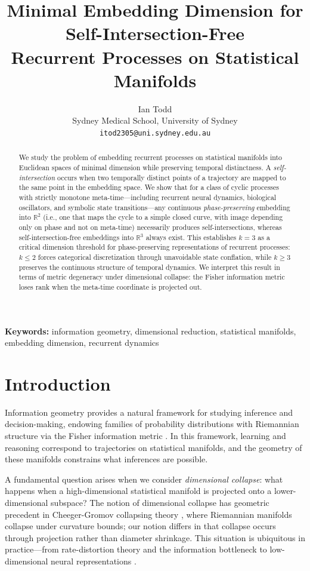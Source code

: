 \documentclass[12pt]{article}
\title{Minimal Embedding Dimension for Self-Intersection-Free \\
Recurrent Processes on Statistical Manifolds}
\author{Ian Todd\\
Sydney Medical School, University of Sydney\\
\texttt{itod2305@uni.sydney.edu.au}}
\date{}
\newcommand{\R}{\mathbb{R}}
\begin{document}
\maketitle

\begin{abstract}
We study the problem of embedding recurrent processes on statistical manifolds into Euclidean spaces of minimal dimension while preserving temporal distinctness. A \emph{self-intersection} occurs when two temporally distinct points of a trajectory are mapped to the same point in the embedding space. We show that for a class of cyclic processes with strictly monotone meta-time---including recurrent neural dynamics, biological oscillators, and symbolic state transitions---any continuous \emph{phase-preserving} embedding into $\R^2$ (i.e., one that maps the cycle to a simple closed curve, with image depending only on phase and not on meta-time) necessarily produces self-intersections, whereas self-intersection-free embeddings into $\R^3$ always exist. This establishes $k=3$ as a critical dimension threshold for phase-preserving representations of recurrent processes: $k \leq 2$ forces categorical discretization through unavoidable state conflation, while $k \geq 3$ preserves the continuous structure of temporal dynamics. We interpret this result in terms of metric degeneracy under dimensional collapse: the Fisher information metric loses rank when the meta-time coordinate is projected out.
\end{abstract}

\noindent\textbf{Keywords:} information geometry, dimensional reduction, statistical manifolds, embedding dimension, recurrent dynamics

\section{Introduction}

Information geometry provides a natural framework for studying inference and decision-making, endowing families of probability distributions with Riemannian structure via the Fisher information metric \citep{amari2016information,rao1945information}. In this framework, learning and reasoning correspond to trajectories on statistical manifolds, and the geometry of these manifolds constrains what inferences are possible.

A fundamental question arises when we consider \emph{dimensional collapse}: what happens when a high-dimensional statistical manifold is projected onto a lower-dimensional subspace? The notion of dimensional collapse has geometric precedent in Cheeger-Gromov collapsing theory \citep{cheeger1986collapsing}, where Riemannian manifolds collapse under curvature bounds; our notion differs in that collapse occurs through projection rather than diameter shrinkage. This situation is ubiquitous in practice---from rate-distortion theory \citep{shannon1959coding} and the information bottleneck \citep{tishby2000information} to low-dimensional neural representations \citep{gallego2017neural}.
\end{document}
